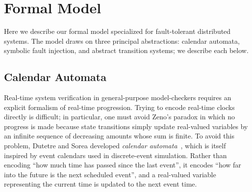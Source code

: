 \documentclass{llncs/llncs}
\begin{document}




\section{Formal Model}\label{sec:model}
Here we describe our formal model specialized for fault-tolerant distributed systems. The model draws on three principal abstractions: calendar automata, symbolic fault injection, and abstract transition systems; we describe each below.

\subsection{Calendar Automata}\label{sec:calendar}

Real-time system verification in general-purpose model-checkers requires an explicit formalism of real-time progression. Trying to encode real-time clocks directly is difficult; in particular, one must avoid Zeno's paradox in which no progress is made because state transitions simply update real-valued variables by an infinite sequence of decreasing amounts whose sum is finite. To avoid this problem, Dutetre and Sorea developed \emph{calendar automata}~\cite{cal}, which is itself inspired by event calendars used in discrete-event simulation. Rather than encoding ``how much time has passed since the last event'', it encodes ``how far into the future is the next scheduled event'', and a real-valued variable representing the current time is updated to the next event time.
\end{document}
